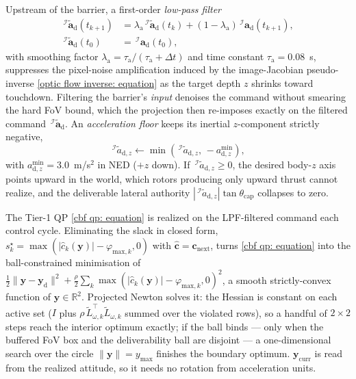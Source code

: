 \documentclass{IEEEtaes}
\theoremstyle{definition}
\theoremstyle{remark}
\begin{document}
Upstream of the barrier, a first-order \emph{low-pass filter}
\begin{align} \label{lpf: equation}
    \,^\mathcal{I}\!\tilde{\boldsymbol{a}}_\text{d}(t_{k+1}) &= \lambda_\text{a}\,^\mathcal{I}\!\tilde{\boldsymbol{a}}_\text{d}(t_k)+(1-\lambda_\text{a})\,^\mathcal{I}\!\boldsymbol{a}_\text{d}(t_{k+1}), \nonumber\\
    \,^\mathcal{I}\!\tilde{\boldsymbol{a}}_\text{d}(t_0) &= \,^\mathcal{I}\!\boldsymbol{a}_\text{d}(t_0),
\end{align}
with smoothing factor $\lambda_\text{a}=\tau_\text{a}/(\tau_\text{a}+\Delta t)$ and time constant $\tau_\text{a}=0.08$~s, suppresses the pixel-noise amplification induced by the image-Jacobian pseudo-inverse \eqref{optic flow inverse: equation} as the target depth $z$ shrinks toward touchdown. Filtering the barrier's \emph{input} denoises the command without smearing the hard FoV bound, which the projection then re-imposes exactly on the filtered command $\,^\mathcal{I}\tilde{\boldsymbol{a}}_\text{d}$. An \emph{acceleration floor} keeps its inertial $z$-component strictly negative,
\begin{equation} \label{acceleration floor: equation}
    \,^\mathcal{I}\tilde{a}_{\text{d},z}\leftarrow \min(\,^\mathcal{I}\tilde{a}_{\text{d},z},\,-a_{\text{d},z}^{\min}),
\end{equation}
with $a_{\text{d},z}^{\min}=3.0$~m/s$^2$ in NED ($+z$ down). If $\,^\mathcal{I}\tilde{a}_{\text{d},z}\ge 0$, the desired body-$z$ axis points upward in the world, which rotors producing only upward thrust cannot realize, and the deliverable lateral authority $|\,^\mathcal{I}\tilde{a}_{\text{d},z}|\tan\theta_\text{cap}$ collapses to zero.

The Tier-1 QP \eqref{cbf qp: equation} is realized on the LPF-filtered command each control cycle. Eliminating the slack in closed form, $s_k^\star=\max(|\hat{c}_k(\boldsymbol{y})|-\varphi_{\text{max},k},0)$ with $\hat{\boldsymbol{c}}=\boldsymbol{c}_\text{next}$, turns \eqref{cbf qp: equation} into the ball-constrained minimisation of $\tfrac12\|\boldsymbol{y}-\boldsymbol{y}_\text{d}\|^2+\tfrac{\rho}{2}\sum_k\max(|\hat{c}_k(\boldsymbol{y})|-\varphi_{\text{max},k},0)^2$, a smooth strictly-convex function of $\boldsymbol{y}\in\mathbb{R}^2$. Projected Newton solves it: the Hessian is constant on each active set ($I$ plus $\rho\,\tilde{L}_{\omega,k}^\top\tilde{L}_{\omega,k}$ summed over the violated rows), so a handful of $2\times2$ steps reach the interior optimum exactly; if the ball binds --- only when the buffered FoV box and the deliverability ball are disjoint --- a one-dimensional search over the circle $\|\boldsymbol{y}\|=y_\text{max}$ finishes the boundary optimum. $\boldsymbol{y}_\text{curr}$ is read from the realized attitude, so it needs no rotation from acceleration units.
\end{document}
